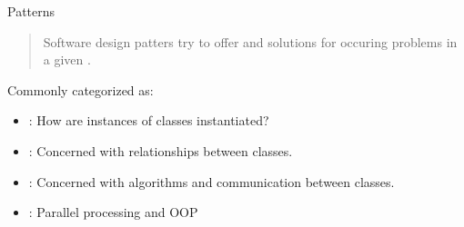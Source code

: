 \begin{frame}{Patterns}
	\begin{quote}
		Software design patters try to offer  and  solutions for  occuring problems in a given .
	\end{quote}

	\bigskip
	
	Commonly categorized as:
	
	\medskip
	\begin{itemize}
		\item 
		: How are instances of classes instantiated? 
		\item 
		: Concerned with relationships between classes. 
		\item 
		: Concerned with algorithms and communication between classes. 
		\item 
		: Parallel processing and OOP 
	\end{itemize}
\end{frame}
%
%
%